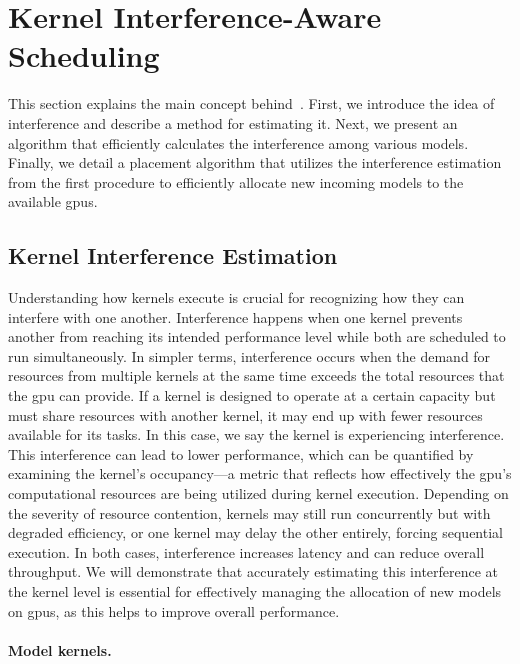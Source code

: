 \section{Kernel Interference-Aware Scheduling}\label{sec:kernel_interference_aware_scheduling}

This section explains the main concept behind~\roomie. First, we introduce the idea of interference and describe a method for estimating it. Next, we present an algorithm that efficiently calculates the interference among various models. Finally, we detail a placement algorithm that utilizes the interference estimation from the first procedure to efficiently allocate new incoming models to the available \acrshort{gpu}s.

\subsection{Kernel Interference Estimation}

Understanding how kernels execute is crucial for recognizing how they can interfere with one another. Interference happens when one kernel prevents another from reaching its intended performance level while both are scheduled to run simultaneously. In simpler terms, interference occurs when the demand for resources from multiple kernels at the same time exceeds the total resources that the \acrshort{gpu} can provide. If a kernel is designed to operate at a certain capacity but must share resources with another kernel, it may end up with fewer resources available for its tasks. In this case, we say the kernel is experiencing interference. This interference can lead to lower performance, which can be quantified by examining the kernel's occupancy—a metric that reflects how effectively the \acrshort{gpu}'s computational resources are being utilized during kernel execution. Depending on the severity of resource contention, kernels may still run concurrently but with degraded efficiency, or one kernel may delay the other entirely, forcing sequential execution. In both cases, interference increases latency and can reduce overall throughput. We will demonstrate that accurately estimating this interference at the kernel level is essential for effectively managing the allocation of new models on \acrshort{gpu}s, as this helps to improve overall performance.

\paragraph{Model kernels.}

